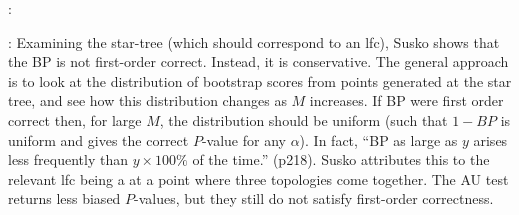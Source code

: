 \documentclass[11pt]{article}
\newcommand{\pvalue}{$P$-value\xspace}
\newcommand{\pvalues}{$P$-values\xspace}
\begin{document}
\citet{Wrobel2008}:


\citet{Susko2009}: Examining the star-tree (which should correspond to an lfc), Susko shows that \citep[{\em contra}\xspace][]{EfronHH1996} the BP is not first-order correct.
Instead, it is conservative. 
The general approach is to look at the distribution of bootstrap scores from points generated at the star tree, and see how this distribution changes as $M$ increases.
If BP were first order correct then, for large $M$, the distribution should be uniform (such that $1-BP$ is uniform and gives the correct \pvalue for any $\alpha$). 
In fact, ``BP as large as $y$ arises less frequently than $y\times 100\%$ of the time.'' (p218).
Susko attributes this to the relevant lfc being a at a point where three topologies come together. 
The AU test returns less biased \pvalues, but they still do not satisfy first-order correctness.




 
\end{document}
